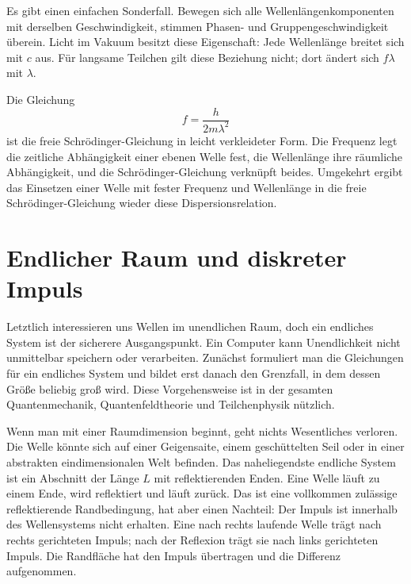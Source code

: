 Es gibt einen einfachen Sonderfall. Bewegen sich alle Wellenlängenkomponenten mit derselben Geschwindigkeit, stimmen Phasen- und Gruppengeschwindigkeit überein. Licht im Vakuum besitzt diese Eigenschaft: Jede Wellenlänge breitet sich mit \(c\) aus. Für langsame Teilchen gilt diese Beziehung nicht; dort ändert sich \(f\lambda\) mit \(\lambda\).

Die Gleichung
\begin{equation}
f=\frac{h}{2m\lambda^2}
\end{equation}
ist die freie Schr\"odinger-Gleichung in leicht verkleideter Form. Die Frequenz legt die zeitliche Abhängigkeit einer ebenen Welle fest, die Wellenlänge ihre räumliche Abhängigkeit, und die Schr\"odinger-Gleichung verknüpft beides. Umgekehrt ergibt das Einsetzen einer Welle mit fester Frequenz und Wellenlänge in die freie Schr\"odinger-Gleichung wieder diese Dispersionsrelation.

\begin{classroomqa}\end{classroomqa}

\section{Endlicher Raum und diskreter Impuls}

Letztlich interessieren uns Wellen im unendlichen Raum, doch ein endliches System ist der sicherere Ausgangspunkt. Ein Computer kann Unendlichkeit nicht unmittelbar speichern oder verarbeiten. Zunächst formuliert man die Gleichungen für ein endliches System und bildet erst danach den Grenzfall, in dem dessen Größe beliebig groß wird. Diese Vorgehensweise ist in der gesamten Quantenmechanik, Quantenfeldtheorie und Teilchenphysik nützlich.

Wenn man mit einer Raumdimension beginnt, geht nichts Wesentliches verloren. Die Welle könnte sich auf einer Geigensaite, einem geschüttelten Seil oder in einer abstrakten eindimensionalen Welt befinden. Das naheliegendste endliche System ist ein Abschnitt der Länge \(L\) mit reflektierenden Enden. Eine Welle läuft zu einem Ende, wird reflektiert und läuft zurück. Das ist eine vollkommen zulässige reflektierende Randbedingung, hat aber einen Nachteil: Der Impuls ist innerhalb des Wellensystems nicht erhalten. Eine nach rechts laufende Welle trägt nach rechts gerichteten Impuls; nach der Reflexion trägt sie nach links gerichteten Impuls. Die Randfläche hat den Impuls übertragen und die Differenz aufgenommen.


